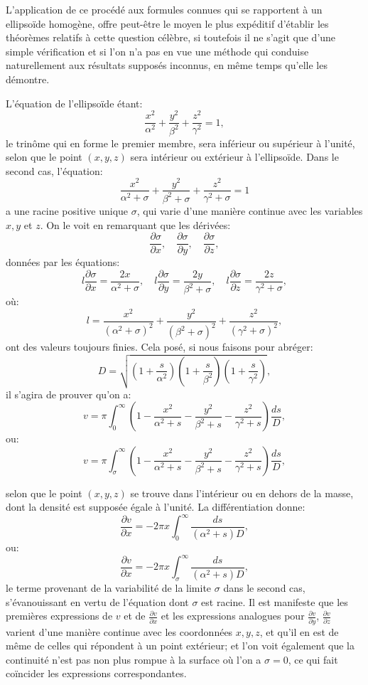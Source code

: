 \documentclass[11pt]{article}
\begin{document}
L'application de ce procédé aux formules connues qui se rapportent à un ellipsoïde homogène, offre peut-être le moyen le plus expéditif d'établir les théorèmes relatifs à cette question célèbre, si toutefois il ne s'agit que d'une simple vérification et si l'on n'a pas en vue une méthode qui conduise naturellement aux résultats supposés inconnus, en même temps qu'elle les démontre.

L'équation de l'ellipsoïde étant:
\[
\frac{x^2}{\alpha^2}+\frac{y^2}{\beta^2}+\frac{z^2}{\gamma^2}=1,
\]
le trinôme qui en forme le premier membre, sera inférieur ou supérieur à l'unité, selon que le point $(x,y,z)$ sera intérieur ou extérieur à l'ellipsoïde. Dans le second cas, l'équation:
\[
\frac{x^2}{\alpha^2+\sigma}+\frac{y^2}{\beta^2+\sigma}+\frac{z^2}{\gamma^2+\sigma}=1
\]
a une racine positive unique $\sigma$, qui varie d'une manière continue avec les variables $x,y$ et $z$. On le voit en remarquant que les dérivées:
\[
\frac{\partial\sigma}{\partial x},\quad \frac{\partial\sigma}{\partial y},\quad \frac{\partial\sigma}{\partial z},
\]
données par les équations:
\begin{equation}\tag{b}
 l\frac{\partial\sigma}{\partial x}=\frac{2x}{\alpha^2+\sigma},\quad
 l\frac{\partial\sigma}{\partial y}=\frac{2y}{\beta^2+\sigma},\quad
 l\frac{\partial\sigma}{\partial z}=\frac{2z}{\gamma^2+\sigma},
\end{equation}
où:
\[
 l=\frac{x^2}{(\alpha^2+\sigma)^2}+\frac{y^2}{(\beta^2+\sigma)^2}+\frac{z^2}{(\gamma^2+\sigma)^2},
\]
ont des valeurs toujours finies. Cela posé, si nous faisons pour abréger:
\[
D=\sqrt{\left(1+\frac{s}{\alpha^2}\right)\left(1+\frac{s}{\beta^2}\right)\left(1+\frac{s}{\gamma^2}\right)},
\]
il s'agira de prouver qu'on a:
\[
 v=\pi\int_0^\infty\left(1-\frac{x^2}{\alpha^2+s}-\frac{y^2}{\beta^2+s}-\frac{z^2}{\gamma^2+s}\right)\frac{ds}{D},
\]
ou:
\[
 v=\pi\int_\sigma^\infty\left(1-\frac{x^2}{\alpha^2+s}-\frac{y^2}{\beta^2+s}-\frac{z^2}{\gamma^2+s}\right)\frac{ds}{D},
\]

selon que le point $(x,y,z)$ se trouve dans l'intérieur ou en dehors de la masse, dont la densité est supposée égale à l'unité. La différentiation donne:
\[
\frac{\partial v}{\partial x}=-2\pi x\int_0^\infty\frac{ds}{(\alpha^2+s)D},
\]
ou:
\[
\frac{\partial v}{\partial x}=-2\pi x\int_\sigma^\infty\frac{ds}{(\alpha^2+s)D},
\]
le terme provenant de la variabilité de la limite $\sigma$ dans le second cas, s'évanouissant en vertu de l'équation dont $\sigma$ est racine. Il est manifeste que les premières expressions de $v$ et de $\frac{\partial v}{\partial x}$ et les expressions analogues pour $\frac{\partial v}{\partial y}$, $\frac{\partial v}{\partial z}$ varient d'une manière continue avec les coordonnées $x,y,z$, et qu'il en est de même de celles qui répondent à un point extérieur; et l'on voit également que la continuité n'est pas non plus rompue à la surface où l'on a $\sigma=0$, ce qui fait coïncider les expressions correspondantes.
\end{document}
